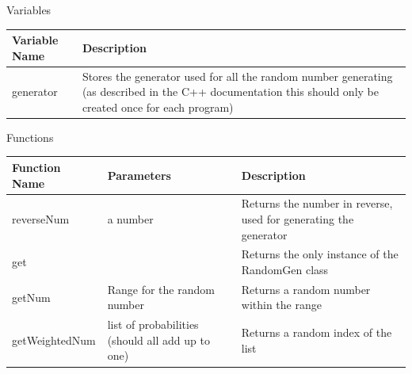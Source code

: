 \documentclass[../../Main.tex]{subfiles}
\begin{document}
    \begin{center}
        Variables
        \begin{tabular}{ | m{} | m{} | }
            \hline
            \textbf{Variable Name} & \textbf{Description} \\
            \hline
            generator & Stores the generator used for all the random number generating (as described in the C++ documentation this should only be created once for each program) \\
            \hline
        \end{tabular}
        Functions
        \begin{tabular}{ | m{} | m{}| m{} | }
            \hline
            \textbf{Function Name} & \textbf{Parameters} & \textbf{Description} \\
            \hline
            reverseNum & a number & Returns the number in reverse, used for generating the generator \\
            \hline
            get & & Returns the only instance of the RandomGen class \\
            \hline
            getNum & Range for the random number & Returns a random number within the range \\
            \hline
            getWeightedNum & list of probabilities (should all add up to one) & Returns a random index of the list \\
            \hline
        \end{tabular}
    \end{center}
\end{document}
